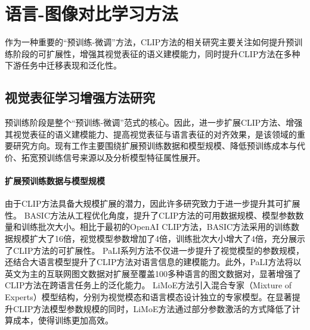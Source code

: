 
\section{语言-图像对比学习方法}
\label{sec:clip-related}
作为一种重要的“预训练-微调”方法，CLIP方法的相关研究主要关注如何提升预训练阶段的可扩展性，增强其视觉表征的语义建模能力，同时提升CLIP方法在多种下游任务中迁移表现和泛化性。

\subsection{视觉表征学习增强方法研究}
预训练阶段是整个“预训练-微调”范式的核心。因此，进一步扩展CLIP方法、增强其视觉表征的语义建模能力、提高视觉表征与语言表征的对齐效果，是该领域的重要研究方向。现有工作主要围绕扩展预训练数据和模型规模、降低预训练成本与代价、拓宽预训练信号来源以及分析模型特征属性展开。

\paragraph{扩展预训练数据与模型规模} 由于CLIP方法具备大规模扩展的潜力，因此许多研究致力于进一步提升其可扩展性。
BASIC方法\cite{pham2023combined}从工程优化角度，提升了CLIP方法的可用数据规模、模型参数数量和训练批次大小。相比于最初的OpenAI CLIP方法\cite{radford2021learning}，BASIC方法采用的训练数据规模扩大了16倍，视觉模型参数增加了4倍，训练批次大小增大了4倍，充分展示了CLIP方法的可扩展性。
PaLI系列方法\cite{pali,palix}不仅进一步提升了视觉模型的参数规模，还结合大语言模型提升了CLIP方法对语言信息的建模能力。此外，PaLI方法将以英文为主的互联网图文数据对扩展至覆盖100多种语言的图文数据对，显著增强了CLIP方法在跨语言任务上的泛化能力。
LiMoE方法\cite{LiMoE}引入混合专家\cite{gshard}（Mixture of Experts）模型结构，分别为视觉模态和语言模态设计独立的专家模型。在显著提升CLIP方法模型参数规模的同时，LiMoE方法通过部分参数激活的方式降低了计算成本，使得训练更加高效。

